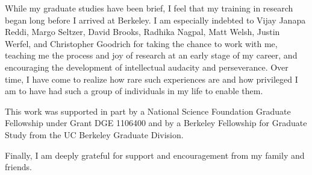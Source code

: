 \documentclass[12pt]{myucthesis}
\begin{document}
\begin{frontmatter}
\begin{acknowledgements}
While my graduate studies have been brief, I feel that my training in
research began long before I arrived at Berkeley. I am especially
indebted to Vijay Janapa Reddi, Margo Seltzer, David Brooks, Radhika
Nagpal, Matt Welsh, Justin Werfel, and Christopher Goodrich for taking
the chance to work with me, teaching me the process and joy of
research at an early stage of my career, and encouraging the
development of intellectual audacity and perseverance. Over time, I
have come to realize how rare such experiences are and how privileged
I am to have had such a group of individuals in my life to enable
them.

This work was supported in part by a National Science Foundation
Graduate Fellowship under Grant DGE 1106400 and by a Berkeley
Fellowship for Graduate Study from the UC Berkeley Graduate Division.

Finally, I am deeply grateful for support and encouragement from
my family and friends.

\end{acknowledgements}

\end{frontmatter}

\makeatletter
\let\@currsize\normalsize
\makeatother

\setlength{\parskip}{.25\baselineskip}%








%

%
%



{}
\end{document}
